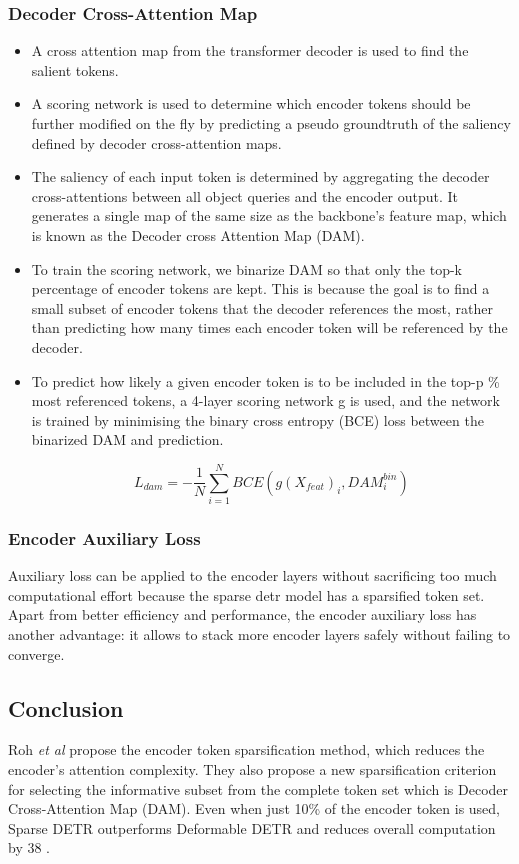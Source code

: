 \subsubsection{Decoder Cross-Attention Map}
\begin{itemize}
	\item A cross attention map from the transformer decoder is used to find the salient tokens.
	\item A scoring network is used to determine which encoder tokens should be further modified on the fly by predicting a pseudo groundtruth of the saliency defined by decoder cross-attention maps.
	\item The saliency of each input token is determined by aggregating the decoder cross-attentions between all object queries and the encoder output. It generates a single map of the same size as the backbone's feature map, which is known as the Decoder cross Attention Map (DAM).
	\item To train the scoring network, we binarize DAM so that only the top-k percentage of encoder tokens are kept. This is because the goal is to find a small subset of encoder tokens that the decoder references the most, rather than predicting how many times each encoder token will be referenced by the decoder.
	\item To predict how likely a given encoder token is to be included in the top-p \% most referenced tokens, a 4-layer scoring network g is used, and the network is trained by minimising the binary cross entropy (BCE) loss between the binarized DAM and prediction.
	
	$$ L_{dam} = -\frac{1}{N}\displaystyle\sum\limits_{i=1}^N BCE(g(X_{feat})_i, DAM^{bin}_i) 
	$$
\end{itemize}

\subsubsection{Encoder Auxiliary Loss}
\par Auxiliary loss can be applied to the encoder layers without sacrificing too much computational effort because the sparse detr model has a sparsified token set. Apart from better efficiency and performance, the encoder auxiliary loss has another advantage: it allows to stack more encoder layers safely without failing to converge.


\subsection{Conclusion}
\par Roh \textit{et al} propose the encoder token sparsification method, which reduces the encoder's attention complexity. They also propose a new sparsification criterion for selecting the informative subset from the complete token set which is Decoder Cross-Attention Map (DAM). Even when just 10\% of the encoder token is used, Sparse DETR outperforms Deformable DETR and reduces overall computation by 38%
.